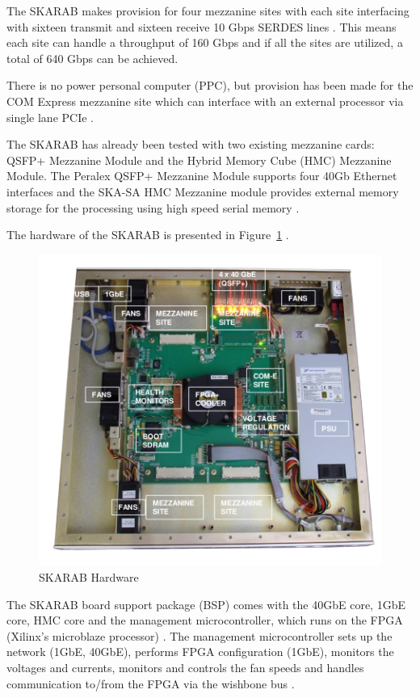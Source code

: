 \documentclass{ws-jai}
\begin{document}
The SKARAB makes provision for four mezzanine sites with each site interfacing with sixteen transmit and sixteen receive 10 Gbps SERDES lines \cite{cliff16}. This means each site can handle a throughput of 160 Gbps and if all the sites are utilized, a total of 640 Gbps can be achieved.

There is no power personal computer (PPC), but provision has been made for the COM Express mezzanine site which can interface with an external processor via single lane PCIe \cite{Teag15}.
 
The SKARAB has already been tested with two existing mezzanine cards: QSFP+ Mezzanine Module and the Hybrid Memory Cube (HMC) Mezzanine Module. The Peralex QSFP+ Mezzanine Module supports four 40Gb Ethernet interfaces and the SKA-SA HMC Mezzanine module provides external memory storage for the processing using high speed serial memory \cite{cliff16}.     

The hardware of the SKARAB is presented in Figure~\ref{fig:skarab_hw} \cite{cliff16}.

\begin{figure}[h]
\centering
\includegraphics[width=150mm, scale=0.5]{skarab_hw}
\caption{SKARAB Hardware}
\label{fig:skarab_hw}
\end{figure}

The SKARAB board support package (BSP) comes with the 40GbE core, 1GbE core, HMC core and the management microcontroller, which runs on the FPGA (Xilinx's microblaze processor) \cite{cliff16}. The management microcontroller sets up the network (1GbE, 40GbE), performs FPGA configuration (1GbE), monitors the voltages and currents, monitors and controls the fan speeds and handles communication to/from the FPGA via the wishbone bus \cite{cliff16} \cite{Teagu15}.
 
\end{document}
